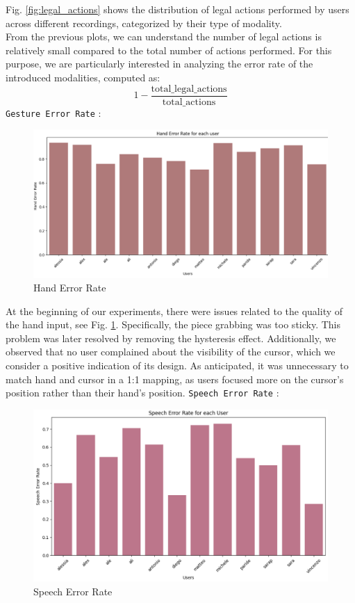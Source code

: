 \documentclass[a4paper, 11pt, twocolumn]{IEEEtran}
\begin{document}
    Fig. \ref{fig:legal_actions} shows the distribution of legal actions performed by users across different recordings, categorized by their type of modality. \\
    From the previous plots, we can understand the number of legal actions is relatively small compared to the total number of actions performed. For this purpose, we are particularly interested in analyzing the error rate of the introduced modalities, computed as: 
    \begin{equation}
        1 - \frac{\mathrm{total\_legal\_actions}}{\mathrm{total\_actions}}
    \end{equation}
    \texttt{Gesture Error Rate} : 
    \begin{figure}
        \centering
        \includegraphics[width=.5\textwidth]{images/hand_error_rate.png}
        \caption{Hand Error Rate }
        \label{fig:hand_error_rate}
    \end{figure}
    At the beginning of our experiments, there were issues related to the quality of the hand input, see Fig. \ref{fig:hand_error_rate}. Specifically, the piece grabbing was too sticky. This problem was later resolved by removing the hysteresis effect. Additionally, we observed that no user complained about the visibility of the cursor, which we consider a positive indication of its design. As anticipated, it was unnecessary to match hand and cursor in a 1:1 mapping, as users focused more on the cursor’s position rather than their hand's position.
    \texttt{Speech Error Rate} : 
    \begin{figure}
        \centering
        \includegraphics[width=.5\textwidth]{images/speech_error_rate.png}
        \caption{Speech Error Rate }
        \label{fig:speech_error_rate}
    \end{figure}
\end{document}
